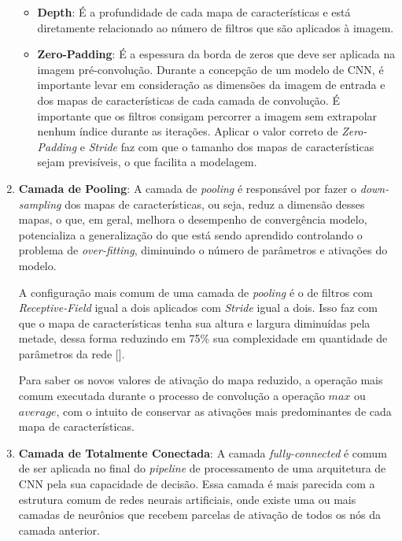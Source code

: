 \begin{enumerate}
\begin{itemize}
                \item \textbf{Depth}: É a profundidade de cada mapa de características e está diretamente relacionado ao número de 
                filtros que são aplicados à imagem.

                \item \textbf{Zero-Padding}: É a espessura da borda de zeros que deve ser aplicada na imagem pré-convolução. Durante a concepção 
                de um modelo de CNN, é importante levar em consideração as dimensões da imagem de entrada e dos mapas de características de cada 
                camada de convolução. É importante que os filtros consigam percorrer a imagem sem extrapolar nenhum índice durante as iterações. 
                Aplicar o valor correto de \textit{Zero-Padding} e \textit{Stride} faz com que o tamanho dos mapas de características sejam 
                previsíveis, o que facilita a modelagem.
            \end{itemize}
            
    \item \textbf{Camada de Pooling}:
            A camada de \textit{pooling} é responsável por fazer o \textit{down-sampling} dos mapas de características, ou seja, reduz a dimensão 
            desses mapas, o que, em geral, melhora o desempenho de convergência modelo, potencializa a generalização do que está sendo aprendido 
            controlando o problema de \textit{over-fitting}, diminuindo o número de parâmetros e ativações do modelo.
            
            A configuração mais comum de uma camada de \textit{pooling} é o de filtros com \textit{Receptive-Field} igual a dois aplicados com 
            \textit{Stride} igual a dois. Isso faz com que o mapa de características tenha sua altura e largura diminuídas pela metade, dessa forma 
            reduzindo em 75\% sua complexidade em quantidade de parâmetros da rede [].
            
            Para saber os novos valores de ativação do mapa reduzido, a operação mais comum executada durante o processo de convolução a operação 
            $max$ ou $average$, com o intuito de conservar as ativações mais predominantes de cada mapa de características.
            
    \item \textbf{Camada de Totalmente Conectada}:
            A camada \textit{fully-connected} é comum de ser aplicada no final do \textit{pipeline} de processamento de uma arquitetura de 
            CNN pela sua capacidade de decisão. Essa camada é mais parecida com a estrutura comum de redes neurais artificiais, onde existe uma ou mais 
            camadas de neurônios que recebem parcelas de ativação de todos os nós da camada anterior.
            

\end{enumerate}
